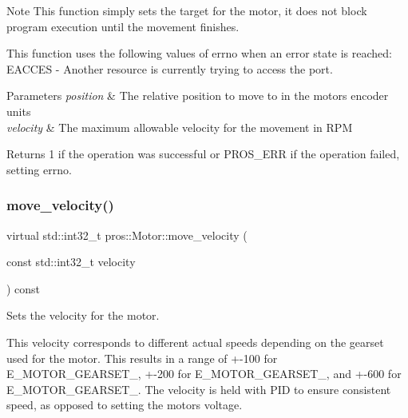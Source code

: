 \begin{DoxyNote}{Note}
This function simply sets the target for the motor, it does not block program execution until the movement finishes.
\end{DoxyNote}
This function uses the following values of errno when an error state is reached\+: E\+A\+C\+C\+ES -\/ Another resource is currently trying to access the port.


\begin{DoxyParams}{Parameters}
{\em position} & The relative position to move to in the motor\textquotesingle{}s encoder units \\
\hline
{\em velocity} & The maximum allowable velocity for the movement in R\+PM\\
\hline
\end{DoxyParams}
\begin{DoxyReturn}{Returns}
1 if the operation was successful or P\+R\+O\+S\+\_\+\+E\+RR if the operation failed, setting errno. 
\end{DoxyReturn}
\mbox{\label{classpros_1_1Motor_a797de937c2d550c3fa199806db07dbcc}} 
\subsubsection{\texorpdfstring{move\_velocity()}{move\_velocity()}}
{\footnotesize\ttfamily virtual std\+::int32\+\_\+t pros\+::\+Motor\+::move\+\_\+velocity (\begin{DoxyParamCaption}\item[{const std\+::int32\+\_\+t}]{velocity }\end{DoxyParamCaption}) const\hspace{0.3cm}{\ttfamily [virtual]}}



Sets the velocity for the motor. 

This velocity corresponds to different actual speeds depending on the gearset used for the motor. This results in a range of +-\/100 for E\+\_\+\+M\+O\+T\+O\+R\+\_\+\+G\+E\+A\+R\+S\+E\+T\+\_, +-\/200 for E\+\_\+\+M\+O\+T\+O\+R\+\_\+\+G\+E\+A\+R\+S\+E\+T\+\_, and +-\/600 for E\+\_\+\+M\+O\+T\+O\+R\+\_\+\+G\+E\+A\+R\+S\+E\+T\+\_. The velocity is held with P\+ID to ensure consistent speed, as opposed to setting the motor\textquotesingle{}s voltage.

